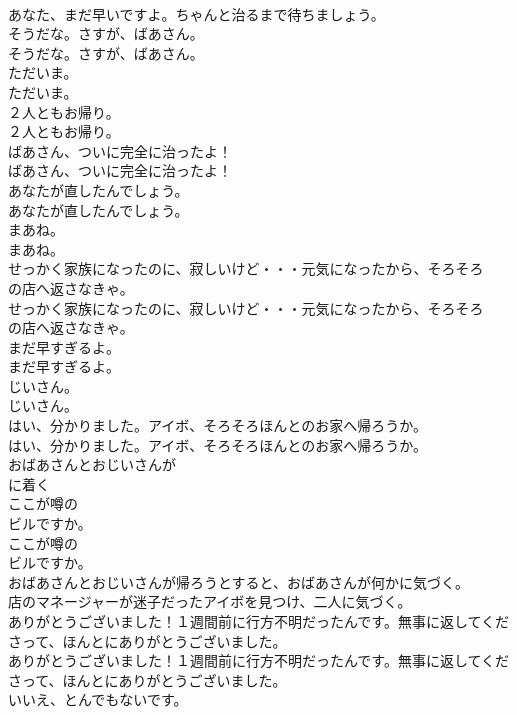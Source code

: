 \documentclass[8pt]{extreport}
\begin{document}
\begin{CJK}{UTF8}{min}
\\	あなた、まだ早いですよ。ちゃんと治るまで待ちましょう。 
\\	そうだな。さすが、ばあさん。	
\\	そうだな。さすが、ばあさん。 
\\	ただいま。	
\\	ただいま。 
\\	２人ともお帰り。	
\\	２人ともお帰り。 
\\	ばあさん、ついに完全に治ったよ！	
\\	ばあさん、ついに完全に治ったよ！ 
\\	あなたが直したんでしょう。	
\\	あなたが直したんでしょう。 
\\	まあね。	
\\	まあね。 
\\	せっかく家族になったのに、寂しいけど・・・元気になったから、そろそろ
\\	の店へ返さなきゃ。	
\\	せっかく家族になったのに、寂しいけど・・・元気になったから、そろそろ
\\	の店へ返さなきゃ。 
\\	まだ早すぎるよ。	
\\	まだ早すぎるよ。 
\\	じいさん。	
\\	じいさん。 
\\	はい、分かりました。アイボ、そろそろほんとのお家へ帰ろうか。	
\\	はい、分かりました。アイボ、そろそろほんとのお家へ帰ろうか。 
\\	おばあさんとおじいさんが
\\	に着く
\\	ここが噂の
\\	ビルですか。	
\\	ここが噂の
\\	ビルですか。 
\\	おばあさんとおじいさんが帰ろうとすると、おばあさんが何かに気づく。
\\	店のマネージャーが迷子だったアイボを見つけ、二人に気づく。
\\	ありがとうございました！１週間前に行方不明だったんです。無事に返してくださって、ほんとにありがとうございました。	
\\	ありがとうございました！１週間前に行方不明だったんです。無事に返してくださって、ほんとにありがとうございました。 
\\	いいえ、とんでもないです。	

\end{CJK}
\end{document}
